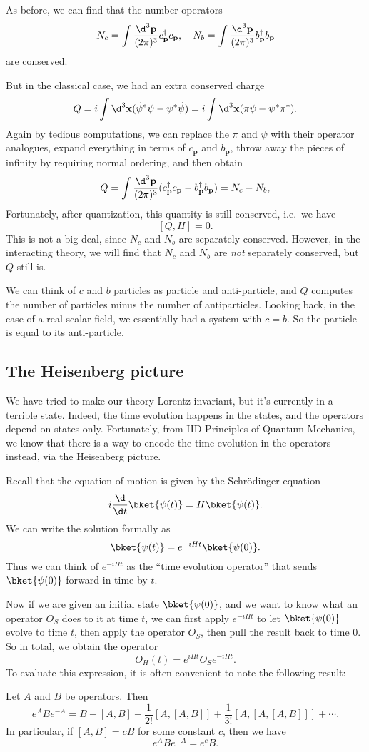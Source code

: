 \documentclass[a4paper]{article}
\begin{document}
As before, we can find that the number operators
\[
  N_c = \int \frac{\d^3 \mathbf{p}}{(2\pi)^3}c_\mathbf{p}^\dagger c_\mathbf{p},\quad N_b = \int \frac{\d^3 \mathbf{p}}{(2\pi)^3}b_\mathbf{p}^\dagger b_\mathbf{p}
\]
are conserved.

But in the classical case, we had an extra conserved charge
\[
  Q = i \int \d^3 \mathbf{x} (\dot{\psi}^* \psi - \psi^* \dot{\psi}) = i \int \d^3 \mathbf{x} (\pi \psi - \psi^* \pi^*).
\]
Again by tedious computations, we can replace the $\pi$ and $\psi$ with their operator analogues, expand everything in terms of $c_\mathbf{p}$ and $b_\mathbf{p}$, throw away the pieces of infinity by requiring normal ordering, and then obtain
\[
  Q = \int \frac{\d^3 \mathbf{p}}{(2\pi)^3} (c_\mathbf{p}^\dagger c_\mathbf{p} - b_\mathbf{p}^\dagger b_\mathbf{p}) = N_c - N_b,
\]
Fortunately, after quantization, this quantity is still conserved, i.e.\ we have
\[
  [Q, H] = 0.
\]
This is not a big deal, since $N_c$ and $N_b$ are separately conserved. However, in the interacting theory, we will find that $N_c$ and $N_b$ are \emph{not} separately conserved, but $Q$ still is.

We can think of $c$ and $b$ particles as particle and anti-particle, and $Q$ computes the number of particles minus the number of antiparticles. Looking back, in the case of a real scalar field, we essentially had a system with $c = b$. So the particle is equal to its anti-particle.

\subsection{The Heisenberg picture}
We have tried to make our theory Lorentz invariant, but it's currently in a terrible state. Indeed, the time evolution happens in the states, and the operators depend on states only. Fortunately, from IID Principles of Quantum Mechanics, we know that there is a way to encode the time evolution in the operators instead, via the Heisenberg picture.

Recall that the equation of motion is given by the Schr\"odinger equation
\[
  i \frac{\d}{\d t}\bket{\psi(t)} = H \bket{\psi(t)}.
\]
We can write the solution formally as
\[
  \bket{\psi(t)} = e^{-iHt} \bket{\psi(0)}.
\]
Thus we can think of $e^{-iHt}$ as the ``time evolution operator'' that sends $\bket{\psi(0)}$ forward in time by $t$.

Now if we are given an initial state $\bket{\psi(0)}$, and we want to know what an operator $O_S$ does to it at time $t$, we can first apply $e^{-iHt}$ to let $\bket{\psi(0)}$ evolve to time $t$, then apply the operator $O_S$, then pull the result back to time $0$. So in total, we obtain the operator
\[
  O_H(t) = e^{iHt} O_S e^{-iHt}.
\]
To evaluate this expression, it is often convenient to note the following result:
\begin{prop}
  Let $A$ and $B$ be operators. Then
  \[
    e^A B e^{-A} = B + [A, B] + \frac{1}{2!}[A, [A, B]] + \frac{1}{3!}[A, [A, [A, B]]] + \cdots.
  \]
  In particular, if $[A, B] = c B$ for some constant $c$, then we have
  \[
    e^A B e^{-A} = e^c B.
  \]
\end{prop}
\end{document}
